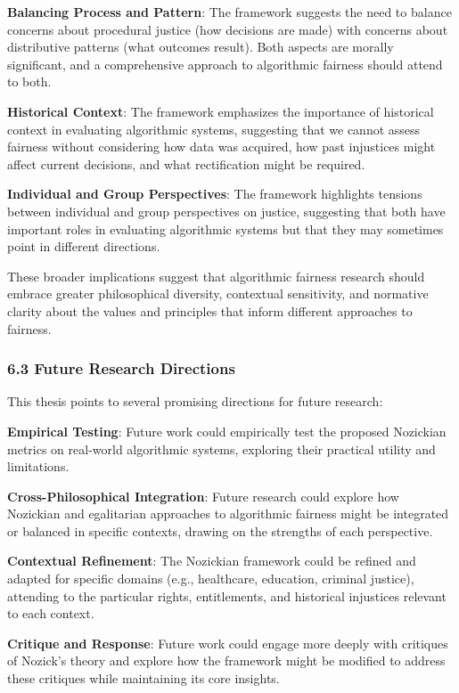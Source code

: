 \textbf{Balancing Process and Pattern}: The framework suggests the need
to balance concerns about procedural justice (how decisions are made)
with concerns about distributive patterns (what outcomes result). Both
aspects are morally significant, and a comprehensive approach to
algorithmic fairness should attend to both.

\textbf{Historical Context}: The framework emphasizes the importance of
historical context in evaluating algorithmic systems, suggesting that we
cannot assess fairness without considering how data was acquired, how
past injustices might affect current decisions, and what rectification
might be required.

\textbf{Individual and Group Perspectives}: The framework highlights
tensions between individual and group perspectives on justice,
suggesting that both have important roles in evaluating algorithmic
systems but that they may sometimes point in different directions.

These broader implications suggest that algorithmic fairness research
should embrace greater philosophical diversity, contextual sensitivity,
and normative clarity about the values and principles that inform
different approaches to fairness.

\subsubsection{6.3 Future Research
Directions}\label{future-research-directions}

This thesis points to several promising directions for future research:

\textbf{Empirical Testing}: Future work could empirically test the
proposed Nozickian metrics on real-world algorithmic systems, exploring
their practical utility and limitations.

\textbf{Cross-Philosophical Integration}: Future research could explore
how Nozickian and egalitarian approaches to algorithmic fairness might
be integrated or balanced in specific contexts, drawing on the strengths
of each perspective.

\textbf{Contextual Refinement}: The Nozickian framework could be refined
and adapted for specific domains (e.g., healthcare, education, criminal
justice), attending to the particular rights, entitlements, and
historical injustices relevant to each context.

\textbf{Critique and Response}: Future work could engage more deeply
with critiques of Nozick's theory and explore how the framework might be
modified to address these critiques while maintaining its core insights.

